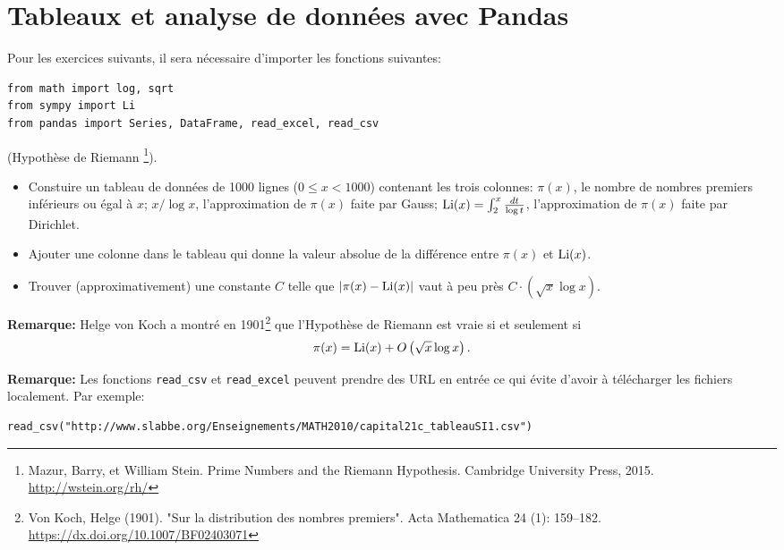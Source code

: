 \section{Tableaux et analyse de données avec Pandas}

Pour les exercices suivants, il sera nécessaire d'importer les fonctions
suivantes:
\begin{verbatim}
from math import log, sqrt
from sympy import Li
from pandas import Series, DataFrame, read_excel, read_csv
\end{verbatim}

\begin{exercice}
(Hypothèse de Riemann
\footnote{Mazur, Barry, et William Stein. Prime Numbers and the Riemann Hypothesis.
Cambridge University Press, 2015. \url{http://wstein.org/rh/}}).
\begin{itemize}
    \item Constuire un tableau de données de 1000 lignes ($0\leq
    x< 1000$) contenant les trois colonnes: 
    $\pi(x)$, le nombre de nombres premiers inférieurs ou égal à $x$;
    $x/\log x$, l'approximation de $\pi(x)$ faite par Gauss;
    ${\rm Li}(x)=\int_2^x \frac{dt}{\log t }$, l'approximation de $\pi(x)$
faite par Dirichlet.
    \item Ajouter une colonne dans le tableau qui donne la valeur absolue de la
différence entre $\pi(x)$ et ${\rm Li}(x)$. 
\end{itemize}
\begin{itemize}
\item Trouver (approximativement) une constante $C$ telle que
    $|\pi(x) - {\rm Li} (x)|$ vaut à peu près $C\cdot\left(\sqrt x \log x\right)$.
\end{itemize}
\noindent\textbf{Remarque:}
Helge von Koch a montré en
1901\footnote{
Von Koch, Helge (1901). "Sur la distribution des nombres premiers". Acta
Mathematica 24 (1): 159–182.
\url{https://dx.doi.org/10.1007/BF02403071}} que l'Hypothèse de Riemann 
est vraie si et seulement si 
\[
    \pi(x) = {\rm Li} (x) +  O\left(\sqrt x \log x\right). 
\]
\end{exercice}

\noindent\textbf{Remarque:}
Les fonctions \texttt{read\_csv} et \texttt{read\_excel} peuvent prendre des
URL en entrée ce qui évite d'avoir à télécharger les fichiers localement. 
Par exemple:
\begin{verbatim}
read_csv("http://www.slabbe.org/Enseignements/MATH2010/capital21c_tableauSI1.csv")
\end{verbatim}

